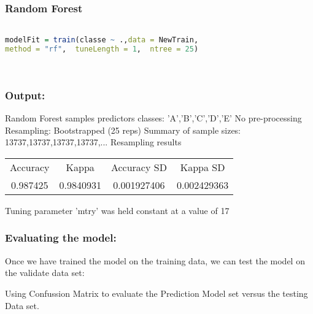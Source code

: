 \documentclass{beamer}
\begin{document}

\begin{frame}[fragile]
\frametitle{Random Forest}

\begin{lstlisting}[language=R]

modelFit = train(classe ~ .,data = NewTrain,  
method = "rf",  tuneLength = 1,  ntree = 25)




\end{lstlisting}
\end{frame}


\begin{frame}[fragile]
\frametitle{Output:}

\begin{tcolorbox}
Random Forest samples predictors classes:  'A',\quad'B',\quad'C',\quad'D',\quad'E'\newline
No pre-processing\newline
Resampling:   Bootstrapped (25 reps)\newline
Summary of sample sizes:  13737,13737,13737,13737,...\newline
Resampling results\newline
\begin{center}
\begin{tabular}{ cccc } 
 Accuracy & Kappa & Accuracy SD & Kappa SD \\ 
 0.987425 & 0.9840931 & 0.001927406 & 0.002429363 \\
\end{tabular}
\end{center}
Tuning parameter 'mtry' was held constant at a value of 17

\end{tcolorbox}
\end{frame}



\begin{frame}[fragile]
\frametitle{Evaluating the model:}
\begin{itemize}
\begin{tcolorbox}
\item Once we have trained the model on the training data, 
we can test the model on the validate data set:\\[12pt]
\item Using Confussion Matrix to evaluate the Prediction Model set 
versus the testing Data set.

\end{tcolorbox}
\end{itemize}
\end{frame}
\end{document}
